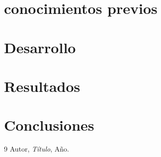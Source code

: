 \documentclass[12pt,a4paper]{report}
\begin{document}
    \chapter{conocimientos previos}


    \chapter{Desarrollo}

    \chapter{Resultados}

    \chapter{Conclusiones}

    \begin{thebibliography}{9}
         Autor, \textit{Título}, Año.
    \end{thebibliography}

    
\end{document}
